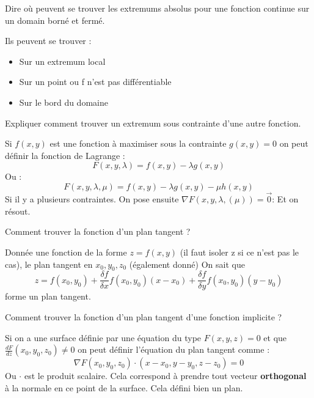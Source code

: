 \documentclass[12pt]{article}
\newcommand*{\xfield}[1]{\begin{mdframed}\centering #1\end{mdframed}\bigskip}
\newenvironment{note}{}{}
\begin{document}
\begin{note}
\xfield{Dire où peuvent se trouver les extremums absolus pour une fonction continue sur un domain borné et fermé.}
\xfield{Ils peuvent se trouver :
\begin{itemize}
\item Sur un extremum local
\item Sur un point ou f n'est pas différentiable
\item Sur le bord du domaine 
\end{itemize}}
\end{note}

\begin{note}
\xfield{Expliquer comment trouver un extremum sous contrainte d'une autre fonction.}
\xfield{Si $f(x,y)$ est une fonction à maximiser sous la contrainte $g(x,y) = 0$ on peut définir la fonction de Lagrange :
$$F(x,y,\lambda) = f(x,y) - \lambda g(x,y)$$
Ou :
$$F(x,y,\lambda, \mu) = f(x,y) - \lambda g(x,y) - \mu h(x,y)$$
Si il y a plusieurs contraintes.
On pose ensuite $\nabla F(x,y,\lambda, (\mu)) = \vec{0}$: Et on résout.}
\end{note}

\begin{note}
\xfield{Comment trouver la fonction d'un plan tangent ?}
\xfield{Donnée une fonction de la forme $z=f(x,y)$ (il faut isoler z si ce n'est pas le cas), le plan tangent en $x_0,y_0,z_0$ (également donné) On sait que
$$ z = f(x_0,y_0) + \frac{\delta f}{\delta x}f(x_0,y_0)(x-x_0) + \frac{\delta f}{\delta y}f(x_0,y_0)(y-y_0) $$ forme un plan tangent.}
\end{note}

\begin{note}
\xfield{Comment trouver la fonction d'un plan tangent d'une fonction implicite ?}
\xfield{Si on a une surface définie par une équation du type $F(x,y,z) = 0$ et que $\frac{dF}{dz}(x_0,y_0,z_0) \neq 0$ on peut définir l'équation du plan tangent comme :
$$\nabla F(x_0,y_0,z_0) \cdot (x-x_0,y-y_0,z-z_0) = 0$$
Ou $\cdot$ est le produit scalaire. Cela correspond à prendre tout vecteur \textbf{orthogonal} à la normale en ce point de la surface. Cela défini bien un plan.
}
\end{note}
\end{document}
